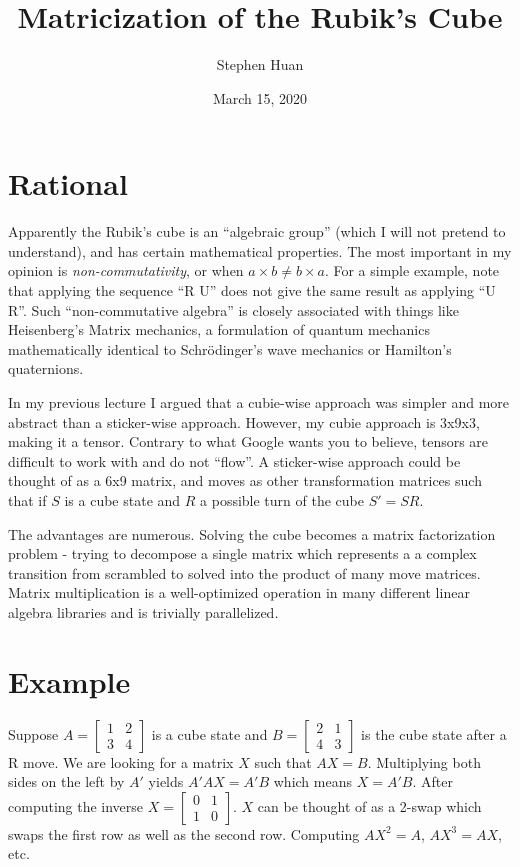\documentclass[11pt, oneside]{article}
\title{Matricization of the Rubik's Cube}
\author{Stephen Huan}
\date{March 15, 2020}
\begin{document}
\maketitle

\section{Rational}
Apparently the Rubik's cube is an ``algebraic group'' (which I will not pretend to understand), and has certain mathematical properties.
The most important in my opinion is \textit{non-commutativity}, or when \( a \times b \neq b \times a \). For a simple example, note that
applying the sequence ``R U'' does not give the same result as applying ``U R''. Such ``non-commutative algebra'' is closely
associated with things like Heisenberg's Matrix mechanics, a formulation of quantum mechanics mathematically identical to Schrödinger's wave mechanics or
Hamilton's quaternions.

In my previous lecture I argued that a cubie-wise approach was simpler and more abstract than a sticker-wise approach. However, my cubie approach is
3x9x3, making it a tensor. Contrary to what Google wants you to believe, tensors are difficult to work with and do not ``flow''. A sticker-wise approach
could be thought of as a 6x9 matrix, and moves as other transformation matrices such that if \( S \) is a cube state and \( R \) a possible turn of the cube
\( S' = S R \).

The advantages are numerous. Solving the cube becomes a matrix factorization problem - trying to decompose a single matrix which represents a
a complex transition from scrambled to solved into the product of many move matrices. Matrix multiplication is a well-optimized operation in
many different linear algebra libraries and is trivially parallelized.

\section{Example}

Suppose \( A = \begin{bmatrix} 1 & 2 \\ 3 & 4 \end{bmatrix} \) is a cube state and \( B = \begin{bmatrix} 2 & 1 \\ 4 & 3 \end{bmatrix} \)
is the cube state after a R move. We are looking for a matrix \( X \) such that \( A X = B \). Multiplying both sides on the left by \( A' \) yields
\( A' A X = A' B \) which means \( X = A' B \). After computing the inverse \( X = \begin{bmatrix} 0 & 1 \\ 1 & 0 \end{bmatrix} \).
\( X \) can be thought of as a 2-swap which swaps the first row as well as the second row. Computing \( AX^2 = A \), \( AX^3 = AX \), etc.
\end{document}

